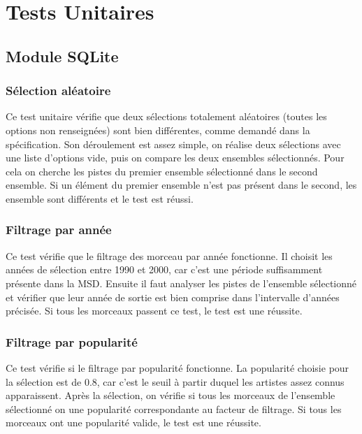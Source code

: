 
\section{Tests Unitaires}
\label{tests:unitaires}

\subsection{Module SQLite}
\label{tests:unitaires:sqlite}

\subsubsection{Sélection aléatoire}
\label{tests:unitaires:sqlite:random}

Ce test unitaire vérifie que deux sélections totalement aléatoires (toutes les
options non renseignées) sont bien différentes, comme demandé dans la
spécification. Son déroulement est assez simple, on réalise deux sélections avec
une liste d'options vide, puis on compare les deux ensembles sélectionnés.
Pour cela on cherche les pistes du premier ensemble sélectionné dans le second
ensemble. Si un élément du premier ensemble n'est pas présent dans le second,
les ensemble sont différents et le test est réussi.

\subsubsection{Filtrage par année}
\label{tests:unitaires:sqlite:annee}

Ce test vérifie que le filtrage des morceau par année fonctionne. Il choisit les
années de sélection entre 1990 et 2000, car c'est une période suffisamment
présente dans la MSD. Ensuite il faut analyser les pistes de l'ensemble
sélectionné et vérifier que leur année de sortie est bien comprise dans
l'intervalle d'années précisée. Si tous les morceaux passent ce test, le test
est une réussite.

\subsubsection{Filtrage par popularité}
\label{tests:unitaires:sqlite:popularite}

Ce test vérifie si le filtrage par popularité fonctionne. La popularité choisie 
pour la sélection est de 0.8, car c'est le seuil à partir duquel les artistes
assez connus apparaissent. Après la sélection, on vérifie si tous les morceaux
de l'ensemble sélectionné on une popularité correspondante au facteur de
filtrage. Si tous les morceaux ont une popularité valide, le test est une
réussite.

